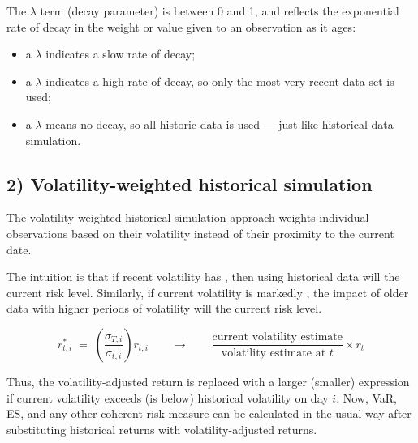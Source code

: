 \begin{mrkeybox}[title={Remember --- the decay parameter}]
The $\lambda$ term (decay parameter) is between 0 and 1, and reflects the exponential rate of
decay in the weight or value given to an observation as it ages:
\begin{itemize}
\item a $\lambda$  indicates a slow rate of decay;
\item a $\lambda$  indicates a high rate of decay, so only the most very
      recent data set is used;
\item a $\lambda$  means no decay, so all historic data is used --- just like
      historical data simulation.
\end{itemize}
\end{mrkeybox}

\subsection{2) Volatility-weighted historical simulation}
The volatility-weighted historical simulation approach weights individual observations based on
their volatility instead of their proximity to the current date.

The intuition is that if recent volatility has , then using historical data will
 the current risk level. Similarly, if current volatility is markedly
, the impact of older data with higher periods of volatility will 
the current risk level.

\begin{mrfmlbox}
\[ r^{*}_{t,i} \;=\; \left( \frac{\sigma_{T,i}}{\sigma_{t,i}} \right) r_{t,i}
   \qquad\longrightarrow\qquad
   \frac{\text{current volatility estimate}}{\text{volatility estimate at } t} \times r_t \]
\end{mrfmlbox}

Thus, the volatility-adjusted return is replaced with a larger (smaller) expression if current
volatility exceeds (is below) historical volatility on day $i$. Now, VaR, ES, and any other
coherent risk measure can be calculated in the usual way after substituting historical returns
with volatility-adjusted returns.


